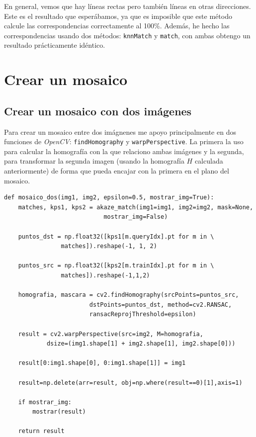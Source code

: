 \documentclass[11pt,a4paper]{article}
\theoremstyle{plain}
\theoremstyle{definition}
\begin{document}
En general, vemos que hay líneas rectas pero también líneas en otras direcciones. Este es el resultado que esperábamos, ya que es imposible que este método calcule las correspondencias correctamente al 100\%. Además, he hecho las correspondencias usando dos métodos: \texttt{knnMatch} y \texttt{match}, con ambas obtengo un resultado prácticamente idéntico.

\section{Crear un mosaico}

\subsection{Crear un mosaico con dos imágenes}

Para crear un mosaico entre dos imágnenes me apoyo principalmente en dos funciones de \textit{OpenCV}: \texttt{findHomography} y \texttt{warpPerspective}. La primera la uso para calcular la homografía con la que relaciono ambas imágenes y la segunda, para transformar la segunda imagen (usando la homografía $H$ calculada anteriormente) de forma que pueda encajar con la primera en el plano del mosaico.

\begin{verbatim}
def mosaico_dos(img1, img2, epsilon=0.5, mostrar_img=True):
    matches, kps1, kps2 = akaze_match(img1=img1, img2=img2, mask=None, 
                            mostrar_img=False)

    puntos_dst = np.float32([kps1[m.queryIdx].pt for m in \
                matches]).reshape(-1, 1, 2)

    puntos_src = np.float32([kps2[m.trainIdx].pt for m in \
                matches]).reshape(-1,1,2)

    homografia, mascara = cv2.findHomography(srcPoints=puntos_src, 
                        dstPoints=puntos_dst, method=cv2.RANSAC,
                        ransacReprojThreshold=epsilon)

    result = cv2.warpPerspective(src=img2, M=homografia, 
            dsize=(img1.shape[1] + img2.shape[1], img2.shape[0]))

    result[0:img1.shape[0], 0:img1.shape[1]] = img1

    result=np.delete(arr=result, obj=np.where(result==0)[1],axis=1)

    if mostrar_img:
        mostrar(result)

    return result
\end{verbatim}
\end{document}
